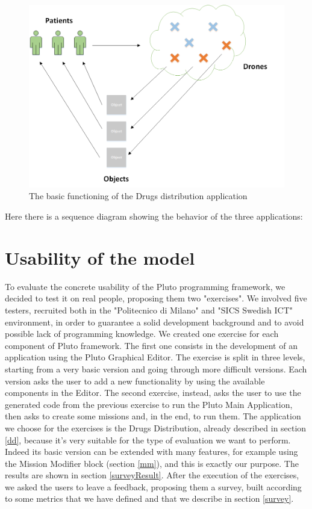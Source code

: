 \begin{figure}[H]
  \centering
  \includegraphics[width=\linewidth]{pictures/DD.png}
  \caption{The basic functioning of the Drugs distribution application}
  \label{fig:DD}
\end{figure}

Here there is a sequence diagram showing the behavior of the three applications:


\newpage

\section{Usability of the model}
\label{usability}

To evaluate the concrete usability of the Pluto programming framework, we decided to test it on real people, proposing them two "exercises".
We involved five testers, recruited both in the "Politecnico di Milano" and "SICS Swedish ICT" environment, in order to guarantee a solid development background and to avoid possible lack of programming knowledge.
We created one exercise for each component of Pluto framework.
The first one consists in the development of an application using the Pluto Graphical Editor.
The exercise is split in three levels, starting from a very basic version and going through more difficult versions. Each version asks the user to add a new functionality by using the available components in the Editor.
The second exercise, instead, asks the user to use the generated code from the previous exercise to run the Pluto Main Application, then asks to create some missions and, in the end, to run them.
The application we choose for the exercises is the Drugs Distribution, already described in section \ref{dd}, because it's very suitable for the type of evaluation we want to perform.
Indeed its basic version can be extended with many features, for example using the Mission Modifier block (section \ref{mm}), and this is exactly our purpose.
The results are shown in section \ref{surveyResult}.
After the execution of the exercises, we asked the users to leave a feedback, proposing them a survey, built according to some metrics that we have defined and that we describe in section \ref{survey}.

